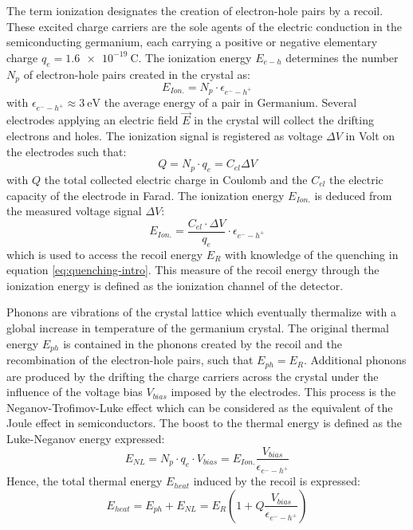 The term ionization designates the creation of electron-hole pairs by a recoil. These excited charge carriers are the sole agents of the electric conduction in the semiconducting germanium, each carrying a positive or negative elementary charge $q_e = \SI{1.6e-19}{\coulomb}$.
The ionization energy $E_{e-h}$ determines the number $N_p$ of electron-hole pairs created in the crystal as:
\begin{equation}
E_{Ion.} = N_p \cdot \epsilon_{e^--h^+}
\end{equation}
with $\epsilon_{e^--h^+} \approx \SI{3}{\eV}$ the average energy of a pair in Germanium. 
Several electrodes applying an electric field $\vec{E}$ in the crystal will collect the drifting electrons and holes. The ionization signal is registered as voltage $\Delta V$ in Volt on the electrodes such that:
\begin{equation}
Q = N_p \cdot q_e = C_{el} \Delta V
\end{equation} 
with $Q$ the total collected electric charge in Coulomb and the $C_{el}$ the electric capacity of the electrode in Farad.
The ionization energy $E_{Ion.}$ is deduced from the measured voltage signal $\Delta V$:
\begin{equation}
E_{Ion.} = \frac{C_{el} \cdot \Delta V}{q_{e}} \cdot \epsilon_{e^--h^+}
\end{equation}
which is used to access the recoil energy $E_R$ with knowledge of the quenching in equation \ref{eq:quenching-intro}. This measure of the recoil energy through the ionization energy is defined as the ionization channel of the  detector.


Phonons are vibrations of the crystal lattice which eventually thermalize with a global increase in temperature of the germanium crystal. The original thermal energy $E_{ph}$ is contained in the phonons created by the recoil and the recombination of the electron-hole pairs, such that $E_{ph} = E_R$.
Additional phonons are produced by the drifting the charge carriers across the crystal under the influence of the voltage bias $V_{bias}$ imposed by the electrodes. This process is the Neganov-Trofimov-Luke effect which can be considered as the equivalent of the Joule effect in semiconductors.
The boost to the thermal energy is defined as the Luke-Neganov energy expressed:
\begin{equation}
E_{NL} = N_p \cdot q_e \cdot V_{bias} = E_{Ion.} \frac{V_{bias}}{\epsilon_{e^--h^+}}
\end{equation}
Hence, the total thermal energy $E_{heat}$ induced by the recoil is expressed:
\begin{equation}
E_{heat} = E_{ph} + E_{NL} = E_R \left( 1 + Q \frac{V_{bias}}{\epsilon_{e^--h^+}} \right)
\end{equation}


